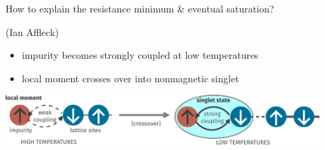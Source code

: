 \documentclass[10pt,aspectratio=169]{beamer}
\begin{document}
\begin{frame}{How to explain the resistance minimum \& eventual saturation?}
\begin{minipage}{0.2\textwidth}
\footnotesize{(Ian Affleck)}
\end{minipage}
\begin{minipage}{0.38\textwidth}
\begin{itemize}
	\item impurity becomes \alert{strongly coupled} at low temperatures
	\item local moment crosses over into \alert{nonmagnetic} singlet
\end{itemize}
\end{minipage}

\vspace*{\fill}
\includegraphics[width=0.9\textwidth]{crossover.pdf}\\

\end{frame}
\end{document}
